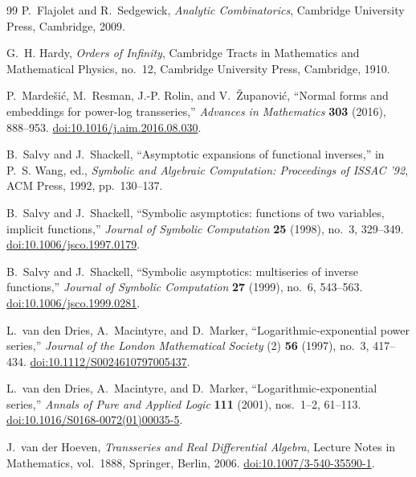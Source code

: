 \documentclass[11pt,oneside,openany]{book}
\begin{document}
\begin{thebibliography}{99}
P.~Flajolet and R.~Sedgewick,
\emph{Analytic Combinatorics},
Cambridge University Press, Cambridge, 2009.

G.~H. Hardy,
\emph{Orders of Infinity},
Cambridge Tracts in Mathematics and Mathematical Physics, no.~12,
Cambridge University Press, Cambridge, 1910.

P.~Marde\v{s}i\'c, M.~Resman, J.-P. Rolin, and V.~\v{Z}upanovi\'c,
``Normal forms and embeddings for power-log transseries,''
\emph{Advances in Mathematics} \textbf{303} (2016), 888--953.
\href{https://doi.org/10.1016/j.aim.2016.08.030}{doi:10.1016/j.aim.2016.08.030}.

B.~Salvy and J.~Shackell,
``Asymptotic expansions of functional inverses,''
in P.~S. Wang, ed., \emph{Symbolic and Algebraic Computation:
Proceedings of ISSAC '92}, ACM Press, 1992, pp.~130--137.

B.~Salvy and J.~Shackell,
``Symbolic asymptotics: functions of two variables, implicit functions,''
\emph{Journal of Symbolic Computation} \textbf{25} (1998), no.~3, 329--349.
\href{https://doi.org/10.1006/jsco.1997.0179}{doi:10.1006/jsco.1997.0179}.

B.~Salvy and J.~Shackell,
``Symbolic asymptotics: multiseries of inverse functions,''
\emph{Journal of Symbolic Computation} \textbf{27} (1999), no.~6, 543--563.
\href{https://doi.org/10.1006/jsco.1999.0281}{doi:10.1006/jsco.1999.0281}.

L.~van den Dries, A.~Macintyre, and D.~Marker,
``Logarithmic-exponential power series,''
\emph{Journal of the London Mathematical Society} (2)
\textbf{56} (1997), no.~3, 417--434.
\href{https://doi.org/10.1112/S0024610797005437}{doi:10.1112/S0024610797005437}.

L.~van den Dries, A.~Macintyre, and D.~Marker,
``Logarithmic-exponential series,''
\emph{Annals of Pure and Applied Logic} \textbf{111} (2001), nos.~1--2,
61--113.
\href{https://doi.org/10.1016/S0168-0072(01)00035-5}{doi:10.1016/S0168-0072(01)00035-5}.

J.~van der Hoeven,
\emph{Transseries and Real Differential Algebra},
Lecture Notes in Mathematics, vol.~1888, Springer, Berlin, 2006.
\href{https://doi.org/10.1007/3-540-35590-1}{doi:10.1007/3-540-35590-1}.

\end{thebibliography}
\end{document}
